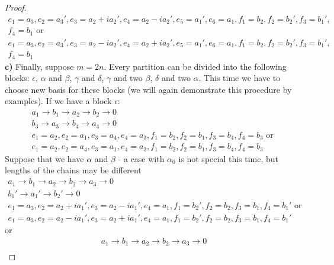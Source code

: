 \documentclass[12pt]{amsart}
\theoremstyle{definition}
\theoremstyle{remark}
\numberwithin{equation}{subsection}
\begin{document}
\begin{proof}
\begin{equation}
\begin{gathered}
    e_{1}=a_3,e_{2}=a_3', e_{3}=a_2+ia_2', e_{4}=a_2-ia_2',e_{5}=a_1',e_{6}=a_1, f_{1}=b_2,f_{2}=b_2',f_{3}=b_1',\\ f_{4}=b_1 \text{ or }\\
    e_{1}=a_3,e_{2}=a_3', e_{3}=a_2-ia_2', e_{4}=a_2+ia_2',e_{5}=a_1',e_{6}=a_1, f_{1}=b_2,f_{2}=b_2',f_{3}=b_1',\\ f_{4}=b_1
\end{gathered}
\end{equation}
\textbf{c)} Finally, suppose $m=2n$. Every partition can be divided into the following blocks: $\epsilon$, $\alpha$ and $\beta$, $\gamma$ and $\delta$, $\gamma$ and two $\beta$, $\delta$ and two $\alpha$. This time we have to choose new basis for these blocks (we will again demonstrate this procedure by examples). If we have a block $\epsilon$:
\begin{equation}
\begin{gathered}
    a_1 \rightarrow b_1 \rightarrow a_2 \rightarrow b_2 \rightarrow 0\\
    b_3 \rightarrow a_3 \rightarrow b_4 \rightarrow a_4 \rightarrow  0\\
    e_{1}=a_2,e_{2}=a_1, e_{3}=a_4, e_{4}=a_3, f_{1}=b_2,f_{2}=b_1,f_{3}=b_4, f_{4}=b_3 \text{ or }\\
    e_{1}=a_2,e_{2}=a_4, e_{3}=a_1, e_{4}=a_3, f_{1}=b_2,f_{2}=b_1,f_{3}=b_4, f_{4}=b_3
\end{gathered}
\end{equation}
Suppose that we have $\alpha$ and $\beta$ - a case with $\alpha_0$ is not special this time, but lengths of the chains may be different
\begin{equation}
\begin{gathered}
    a_1 \rightarrow b_1 \rightarrow a_2 \rightarrow b_2 \rightarrow a_3 \rightarrow 0\\
    b_1' \rightarrow a_1' \rightarrow b_2' \rightarrow 0\\
    e_{1}=a_3,e_{2}=a_2+ia_1', e_{3}=a_2-ia_1', e_{4}=a_1, f_{1}=b_2',f_{2}=b_2,f_{3}=b_1, f_{4}=b_1' \text{ or }\\
    e_{1}=a_3,e_{2}=a_2-ia_1', e_{3}=a_2+ia_1', e_{4}=a_1, f_{1}=b_2',f_{2}=b_2,f_{3}=b_1, f_{4}=b_1'
\end{gathered}
\end{equation}
or
\begin{equation}
\begin{gathered}
    a_1 \rightarrow b_1 \rightarrow a_2 \rightarrow b_2 \rightarrow a_3 \rightarrow 0\\

\end{gathered}
\end{equation}
\end{proof}
\end{document}
